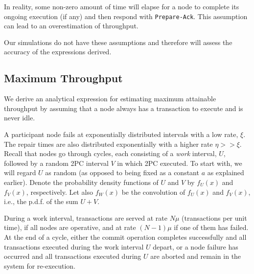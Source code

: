 In reality, some non-zero amount of time will elapse for a node to complete its ongoing execution (if any) and then respond with \texttt{Prepare-Ack}.
This assumption can lead to an overestimation of throughput.

Our simulations do not have these assumptions and therefore will assess the accuracy of the expressions derived.


\subsection{Maximum Throughput}
\label{sec:maximum-throughput}

We derive an analytical expression for estimating maximum attainable throughput by assuming that 
a node always has a transaction to execute and is never idle.

A participant node fails at exponentially distributed intervals
with a low rate, $\xi$.
The repair times are also distributed exponentially with a higher rate $\eta >>\xi$.
Recall that nodes go through cycles, each consisting
of a \emph{work} interval, $U$, followed by a random 2PC interval $V$ in which 2PC executed. To start with, we will regard $U$ as random (as opposed to being fixed as a constant $a$ as explained earlier).
Denote the probability density functions of $U$ and $V$ by $f_U(x)$ and
$f_V(x)$, respectively.
Let also $f_W(x)$ be the convolution of $f_U(x)$ and $f_V(x)$, i.e., the p.d.f. of the sum
$U+V$.

During a work interval, transactions are served at rate $N\mu$ (transactions per unit
time), if all nodes are operative, and at rate $(N-1)\mu$ if one of them has failed.
At the end of a %
cycle, either the commit operation completes
successfully and all transactions executed during the work interval $U$ depart,
or a node failure has occurred and all transactions executed during $U$ are aborted and remain in the system for re-execution.

